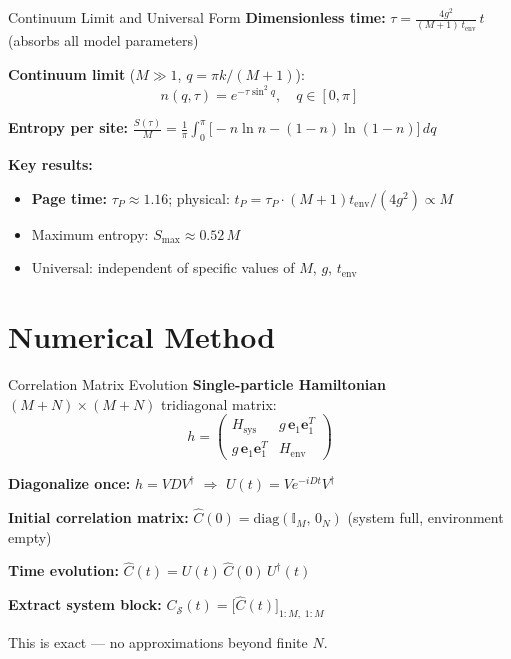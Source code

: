 \documentclass[aspectratio=169,11pt]{beamer}
\begin{document}
\begin{frame}{Continuum Limit and Universal Form}
\small
    \textbf{Dimensionless time:}
    $\tau = \frac{4g^2}{(M+1)\,t_{\mathrm{env}}}\, t$ \quad (absorbs all model parameters)

    \textbf{Continuum limit} ($M \gg 1$, $q = \pi k/(M{+}1)$):
    \[
        \boxed{n(q, \tau) = e^{-\tau \sin^2 q}, \quad q \in [0, \pi]}
    \]

    \textbf{Entropy per site:}
    $\displaystyle\frac{S(\tau)}{M} = \frac{1}{\pi}\int_0^\pi \!\Big[-n\ln n - (1{-}n)\ln(1{-}n)\Big]\,dq$

    \textbf{Key results:}
    \begin{itemize}\setlength{\itemsep}{1pt}
        \item \textbf{Page time:} $\tau_P \approx 1.16$; physical: $t_P = \tau_P\cdot(M{+}1)t_{\mathrm{env}}/(4g^2) \propto M$
        \item Maximum entropy: $S_{\max} \approx 0.52\,M$
        \item \alert{Universal}: independent of specific values of $M$, $g$, $t_{\mathrm{env}}$
    \end{itemize}
\end{frame}

\section{Numerical Method}

\begin{frame}{Correlation Matrix Evolution}
\small
    \textbf{Single-particle Hamiltonian} $(M{+}N) \times (M{+}N)$ tridiagonal matrix:
    \[
        h = \begin{pmatrix}
            H_{\mathrm{sys}} & g\,\mathbf{e}_1 \mathbf{e}_1^T \\
            g\,\mathbf{e}_1 \mathbf{e}_1^T & H_{\mathrm{env}}
        \end{pmatrix}
    \]

    \textbf{Diagonalize once:} $h = V D V^\dagger$ $\Longrightarrow$ $U(t) = V e^{-iDt} V^\dagger$

    \textbf{Initial correlation matrix:}
    $\hat{C}(0) = \mathrm{diag}(\mathbb{I}_M,\, 0_N)$ \quad (system full, environment empty)

    \textbf{Time evolution:}
    $\hat{C}(t) = U(t)\,\hat{C}(0)\,U^\dagger(t)$

    \textbf{Extract system block:}
    $C_{\mathcal{S}}(t) = \big[\hat{C}(t)\big]_{1:M,\;1:M}$

    {\footnotesize This is exact --- no approximations beyond finite $N$.}
\end{frame}
\end{document}
